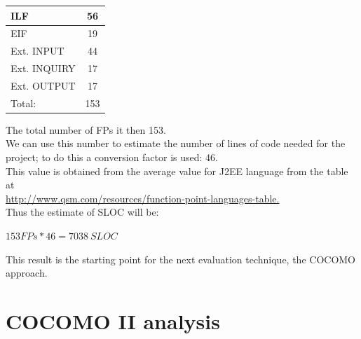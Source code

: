 \documentclass[a4paper,11pt]{report} %
\begin{document}
\begin{itemize}
\begin{center}
\begin{tabular}{| p{7cm} | p{2cm} |}
						ILF & \multicolumn{1}{|c|}{56}\\\hline
						EIF & \multicolumn{1}{|c|}{19}\\\hline
						Ext. INPUT & \multicolumn{1}{|c|}{44}\\\hline
						Ext. INQUIRY & \multicolumn{1}{|c|}{17}\\\hline		
						Ext. OUTPUT & \multicolumn{1}{|c|}{17}\\\hline																						
						Total: & \multicolumn{1}{|c|}{153}\\\hline
					\end{tabular}
				\end{center}																					
			\end{itemize}
			\bigskip	
			The total number of FPs it then 153.\bigskip\\
			We can use this number to estimate the number of lines of code needed for the project; to do this a conversion factor is used: 46.\\
			This value is obtained from the average value for J2EE language from the table at\\ \href{http://www.qsm.com/resources/function-point-languages-table}{http://www.qsm.com/resources/function-point-languages-table.}\bigskip\\
			Thus the estimate of SLOC will be: \begin{center}\(153FPs * 46 = 7038 \ SLOC\)\end{center}
			This result is the starting point for the next evaluation technique, the COCOMO approach.
	\pagebreak		
	\section{COCOMO II analysis}
\end{document}
